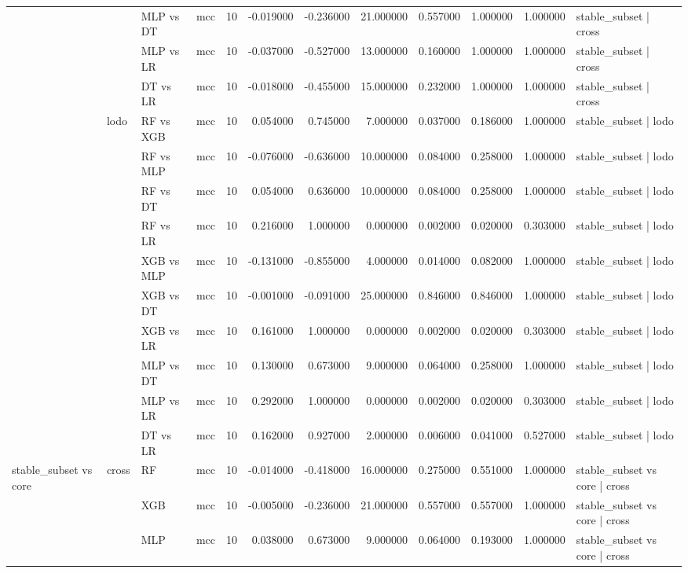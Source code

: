 \begin{tabular}{llllrrrrrrrl}
 &  & MLP vs DT & mcc & 10 & -0.019000 & -0.236000 & 21.000000 & 0.557000 & 1.000000 & 1.000000 & stable_subset | cross \\
 &  & MLP vs LR & mcc & 10 & -0.037000 & -0.527000 & 13.000000 & 0.160000 & 1.000000 & 1.000000 & stable_subset | cross \\
 &  & DT vs LR & mcc & 10 & -0.018000 & -0.455000 & 15.000000 & 0.232000 & 1.000000 & 1.000000 & stable_subset | cross \\
\cline{2-12}
 & \multirow[t]{10}{*}{lodo} & RF vs XGB & mcc & 10 & 0.054000 & 0.745000 & 7.000000 & 0.037000 & 0.186000 & 1.000000 & stable_subset | lodo \\
 &  & RF vs MLP & mcc & 10 & -0.076000 & -0.636000 & 10.000000 & 0.084000 & 0.258000 & 1.000000 & stable_subset | lodo \\
 &  & RF vs DT & mcc & 10 & 0.054000 & 0.636000 & 10.000000 & 0.084000 & 0.258000 & 1.000000 & stable_subset | lodo \\
 &  & RF vs LR & mcc & 10 & 0.216000 & 1.000000 & 0.000000 & 0.002000 & 0.020000 & 0.303000 & stable_subset | lodo \\
 &  & XGB vs MLP & mcc & 10 & -0.131000 & -0.855000 & 4.000000 & 0.014000 & 0.082000 & 1.000000 & stable_subset | lodo \\
 &  & XGB vs DT & mcc & 10 & -0.001000 & -0.091000 & 25.000000 & 0.846000 & 0.846000 & 1.000000 & stable_subset | lodo \\
 &  & XGB vs LR & mcc & 10 & 0.161000 & 1.000000 & 0.000000 & 0.002000 & 0.020000 & 0.303000 & stable_subset | lodo \\
 &  & MLP vs DT & mcc & 10 & 0.130000 & 0.673000 & 9.000000 & 0.064000 & 0.258000 & 1.000000 & stable_subset | lodo \\
 &  & MLP vs LR & mcc & 10 & 0.292000 & 1.000000 & 0.000000 & 0.002000 & 0.020000 & 0.303000 & stable_subset | lodo \\
 &  & DT vs LR & mcc & 10 & 0.162000 & 0.927000 & 2.000000 & 0.006000 & 0.041000 & 0.527000 & stable_subset | lodo \\
\cline{1-12} \cline{2-12}
\multirow[t]{5}{*}{stable_subset vs core} & \multirow[t]{5}{*}{cross} & RF & mcc & 10 & -0.014000 & -0.418000 & 16.000000 & 0.275000 & 0.551000 & 1.000000 & stable_subset vs core | cross \\
 &  & XGB & mcc & 10 & -0.005000 & -0.236000 & 21.000000 & 0.557000 & 0.557000 & 1.000000 & stable_subset vs core | cross \\
 &  & MLP & mcc & 10 & 0.038000 & 0.673000 & 9.000000 & 0.064000 & 0.193000 & 1.000000 & stable_subset vs core | cross \\

\end{tabular}
